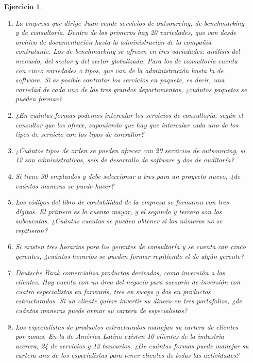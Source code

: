 \documentclass[12pt,twoside]{article}
\newtheorem{Ejer}{Ejercicio}
\begin{document}
\begin{Ejer}
\begin{enumerate}

\item La empresa que dirige Juan vende servicios de outsourcing, de benchmarking y de consultoría. Dentro de los primeros hay 20 variedades, que van desde archivo de documentación hasta la administración de la compañía contratante. Los de benchmarking se ofrecen en tres variedades: análisis del mercado, del sector y del sector globalizado. Para los de consultoría cuenta con cinco variedades o tipos, que van de la administración hasta la de software. Si es posible contratar los servicios en paquete, es decir, una variedad de cada uno de los tres grandes departamentos, ¿cuántos paquetes se pueden formar?

\item ¿En cuántas formas podemos intercalar los servicios de consultoría, según el consultor que los ofrece, suponiendo que hay que intercalar cada uno de los tipos de servicio con los tipos de consultor?

\item ¿Cuántos tipos de orden se pueden ofrecer con 20 servicios de outsourcing, si 12 son administrativos, seis de desarrollo de software y dos de auditoría?

\item Si tiene 30 empleados y debe seleccionar a tres para un proyecto nuevo, ¿de cuántas maneras se puede hacer?

\item Los códigos del libro de contabilidad de la empresa se formaron con tres dígitos. El primero es la cuenta mayor, y el segundo y tercero son las subcuentas. ¿Cuántas cuentas se pueden obtener si los números no se repitieran?

\item Si existen tres horarios para los gerentes de consultoría y se cuenta con cinco gerentes, ¿cuántos horarios se pueden formar repitiendo el de algún gerente?

\item Deutsche Bank comercializa productos derivados, como inversión a los clientes. Hoy cuenta con un área del negocio para asesoría de inversión con cuatro especialistas en forwards, tres en swaps y dos en productos estructurados. Si un cliente quiere invertir su dinero en tres portafolios, ¿de cuántas maneras puede armar su cartera de especialistas?

\item Los especialistas de productos estructurados manejan su cartera de clientes por zonas. En la de América Latina existen 10 clientes de la industria acerera, 24 de servicios y 12 bancarios. ¿De cuántas formas puede manejar su cartera uno de los especialistas para tener clientes de todas las actividades?


\end{enumerate}
\end{Ejer}
\end{document}

